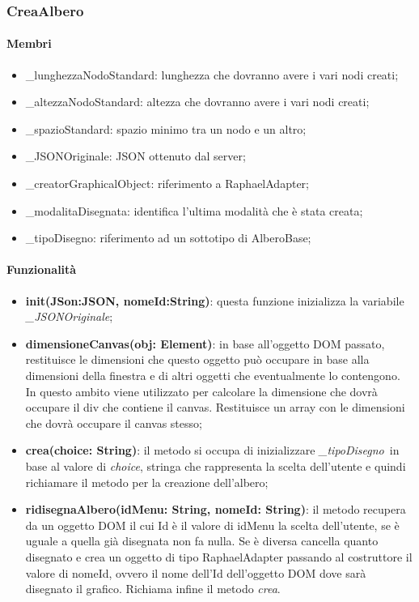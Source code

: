 \subsubsection{CreaAlbero}
\paragraph{Membri}
\begin{itemize}
\item \_lunghezzaNodoStandard: lunghezza che dovranno avere i vari nodi creati;
\item \_altezzaNodoStandard: altezza che dovranno avere i vari nodi creati;
\item \_spazioStandard: spazio minimo tra un nodo e un altro;
\item \_JSONOriginale: JSON ottenuto dal server;
\item \_creatorGraphicalObject: riferimento a RaphaelAdapter;
\item \_modalitaDisegnata: identifica l'ultima modalità che è stata creata;
\item \_tipoDisegno: riferimento ad un sottotipo di AlberoBase;
\end{itemize}
\paragraph{Funzionalità}
\begin{itemize}
\item \textbf{init(JSon:JSON, nomeId:String)}: questa funzione inizializza la variabile \textit{\_JSONOriginale};
\item \textbf{dimensioneCanvas(obj: Element)}: in base all'oggetto DOM passato, restituisce le dimensioni che questo oggetto può occupare in base alla dimensioni della finestra e di altri oggetti che eventualmente lo contengono. In questo ambito viene utilizzato per calcolare la dimensione che dovrà occupare il div che contiene il canvas. Restituisce un array con le dimensioni che dovrà occupare il canvas stesso;
\item \textbf{crea(choice: String)}: il metodo si occupa di inizializzare \textit{\_tipoDisegno}\ in base al valore di \textit{choice}, stringa che rappresenta la scelta dell'utente e quindi richiamare il metodo per la creazione dell'albero; 
\item \textbf{ridisegnaAlbero(idMenu: String, nomeId: String)}: il metodo recupera da un oggetto DOM il cui Id è il valore di idMenu la scelta dell'utente, se è uguale a quella già disegnata non fa nulla. Se è diversa cancella quanto disegnato e crea un oggetto di tipo RaphaelAdapter passando al costruttore il valore di nomeId, ovvero il nome dell'Id dell'oggetto DOM dove sarà disegnato il grafico. Richiama infine il metodo \textit{crea}.
\end{itemize}
